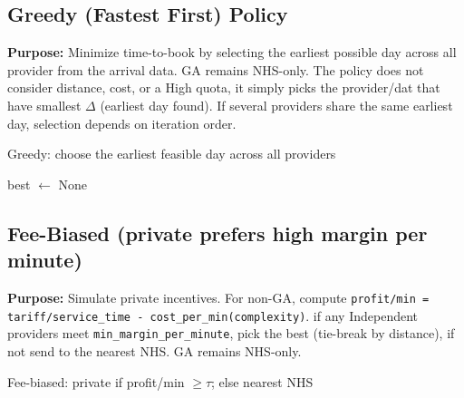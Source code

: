 \documentclass[ %
                    author={Nattanan Nawakitbamrung},
                supervisor={Dr. Sébastien Rochat},
                    degree={MSc},
                     title={Developing and Evaluating the Impact of a Single Patient Treatment List (PTL) for an NHS Integrated Care System},
                  subtitle={},
                      type={},
                      year={2025}]{dissertation}
\begin{document}
\subsection{Greedy (Fastest First) Policy}
\textbf{Purpose:} Minimize time-to-book by selecting the earliest possible day across all provider from the arrival data. GA remains NHS-only. The policy does not consider distance, cost, or a High quota, it simply picks the provider/dat that have smallest $\Delta$ (earliest day found). If several providers share the same earliest day, selection depends on iteration order. 

\begin{algorithm}[htbp]
\caption{Greedy: choose the earliest feasible day across all providers}
\label{alg:policy-greedy}
best $\leftarrow$ None  
\end{algorithm}

\subsection{Fee-Biased (private prefers high margin per minute)}
\textbf{Purpose:} Simulate private incentives. For non-GA, compute \texttt{profit/min = tariff/service\_time - cost\_per\_min(complexity)}. if any Independent providers meet \texttt{min\_margin\_per\_minute}, pick the best (tie-break by distance), if not send to the nearest NHS. GA remains NHS-only.

\begin{algorithm}[htbp]
\caption{Fee-biased: private if profit/min $\ge \tau$; else nearest NHS}
\label{alg:policy-fee}
\end{algorithm}
\end{document}

